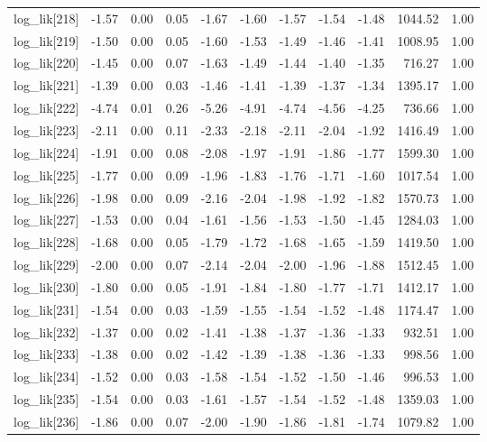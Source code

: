 \begin{table}[ht]
\begin{tabular}{rrrrrrrrrrr}
  log\_lik[218] & -1.57 & 0.00 & 0.05 & -1.67 & -1.60 & -1.57 & -1.54 & -1.48 & 1044.52 & 1.00 \\ 
  log\_lik[219] & -1.50 & 0.00 & 0.05 & -1.60 & -1.53 & -1.49 & -1.46 & -1.41 & 1008.95 & 1.00 \\ 
  log\_lik[220] & -1.45 & 0.00 & 0.07 & -1.63 & -1.49 & -1.44 & -1.40 & -1.35 & 716.27 & 1.00 \\ 
  log\_lik[221] & -1.39 & 0.00 & 0.03 & -1.46 & -1.41 & -1.39 & -1.37 & -1.34 & 1395.17 & 1.00 \\ 
  log\_lik[222] & -4.74 & 0.01 & 0.26 & -5.26 & -4.91 & -4.74 & -4.56 & -4.25 & 736.66 & 1.00 \\ 
  log\_lik[223] & -2.11 & 0.00 & 0.11 & -2.33 & -2.18 & -2.11 & -2.04 & -1.92 & 1416.49 & 1.00 \\ 
  log\_lik[224] & -1.91 & 0.00 & 0.08 & -2.08 & -1.97 & -1.91 & -1.86 & -1.77 & 1599.30 & 1.00 \\ 
  log\_lik[225] & -1.77 & 0.00 & 0.09 & -1.96 & -1.83 & -1.76 & -1.71 & -1.60 & 1017.54 & 1.00 \\ 
  log\_lik[226] & -1.98 & 0.00 & 0.09 & -2.16 & -2.04 & -1.98 & -1.92 & -1.82 & 1570.73 & 1.00 \\ 
  log\_lik[227] & -1.53 & 0.00 & 0.04 & -1.61 & -1.56 & -1.53 & -1.50 & -1.45 & 1284.03 & 1.00 \\ 
  log\_lik[228] & -1.68 & 0.00 & 0.05 & -1.79 & -1.72 & -1.68 & -1.65 & -1.59 & 1419.50 & 1.00 \\ 
  log\_lik[229] & -2.00 & 0.00 & 0.07 & -2.14 & -2.04 & -2.00 & -1.96 & -1.88 & 1512.45 & 1.00 \\ 
  log\_lik[230] & -1.80 & 0.00 & 0.05 & -1.91 & -1.84 & -1.80 & -1.77 & -1.71 & 1412.17 & 1.00 \\ 
  log\_lik[231] & -1.54 & 0.00 & 0.03 & -1.59 & -1.55 & -1.54 & -1.52 & -1.48 & 1174.47 & 1.00 \\ 
  log\_lik[232] & -1.37 & 0.00 & 0.02 & -1.41 & -1.38 & -1.37 & -1.36 & -1.33 & 932.51 & 1.00 \\ 
  log\_lik[233] & -1.38 & 0.00 & 0.02 & -1.42 & -1.39 & -1.38 & -1.36 & -1.33 & 998.56 & 1.00 \\ 
  log\_lik[234] & -1.52 & 0.00 & 0.03 & -1.58 & -1.54 & -1.52 & -1.50 & -1.46 & 996.53 & 1.00 \\ 
  log\_lik[235] & -1.54 & 0.00 & 0.03 & -1.61 & -1.57 & -1.54 & -1.52 & -1.48 & 1359.03 & 1.00 \\ 
  log\_lik[236] & -1.86 & 0.00 & 0.07 & -2.00 & -1.90 & -1.86 & -1.81 & -1.74 & 1079.82 & 1.00 \\ 

\end{tabular}
\end{table}
